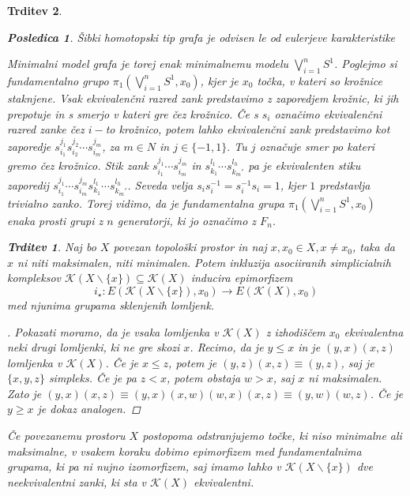 \documentclass[a4paper,12pt]{article}
\DeclareRobustCommand{\k}{
    \mathcal{K}
}
\theoremstyle{definition}
\theoremstyle{plain}
\theoremstyle{definition}
\theoremstyle{plain}
\newtheorem{trditev}{Trditev}
\theoremstyle{plain}
\newtheorem{posledica}{Posledica}
\theoremstyle{plain}
\theoremstyle{plain}
\newenvironment{dokaz}{\begin{proof}[\bfseries\upshape\proofname]}{\end{proof}}
\begin{document}
\begin{trditev}
\begin{posledica}
    \label{pos:karakteristika}
    Šibki homotopski tip grafa je odvisen le od eulerjeve karakteristike
\end{posledica}

Minimalni model grafa je torej enak minimalnemu modelu  $\bigvee\limits_{i=1}^{n}S^1$. Poglejmo si 
fundamentalno grupo  $\pi_1(\bigvee\limits_{i=1}^{n}S^1,x_0)$, kjer je $x_0$ točka, v kateri so krožnice 
staknjene. Vsak ekvivalenčni razred zank predstavimo z zaporedjem krožnic, ki jih prepotuje in s 
smerjo v kateri gre čez krožnico. Če s $s_i$ označimo ekvivalenčni razred zanke čez $i-$to krožnico, potem lahko ekvivalenčni 
zank  predstavimo kot zaporedje $s_{i_1}^{j_1}s_{i_2}^{j_2}\cdots s_{i_m}^{j_m}$, za $m\in N$ in 
$j\in \{-1,1\}.$ Tu $j$ označuje smer po kateri gremo čez krožnico. Stik zank 
$s_{i_1}^{j_1}\cdots s_{i_m}^{j_m}$ in $s_{k_1}^{l_1}\cdots s_{k_m'}^{l_h}$ pa je ekvivalenten 
stiku zaporedij $s_{i_1}^{j_1}\cdots s_{i_m}^{j_m}s_{k_1}^{l_1}\cdots s_{k_m'}^{l_h}$.
Seveda velja $s_i s_i^{-1}=s_i^{-1}s_i=1$, kjer $1$ predstavlja trivialno zanko. 
Torej vidimo, da je fundamentalna grupa $\pi_1(\bigvee\limits_{i=1}^{n}S^1,x_0)$ enaka prosti grupi z $n$
generatorji, ki jo označimo z $F_n$.

\begin{trditev}
    Naj bo $X$ povezan topološki prostor in naj $x,x_0\in X, x\neq x_0$, taka da $x$ ni niti maksimalen, niti minimalen. Potem inkluzija asociiranih simplicialnih kompleksov $\k(X\backslash\{x\})\subseteq \k(X)$ inducira epimorfizem 
    $$
i_\star:E(\k(X\backslash\{x\}),x_0)\rightarrow E(\k(X),x_0)
    $$
    med njunima grupama sklenjenih lomljenk.
\end{trditev}

\begin{dokaz}
    Pokazati moramo, da je vsaka lomljenka v $\k(X)$ z izhodiščem $x_0$ ekvivalentna neki drugi lomljenki, ki ne gre skozi $x$.
    Recimo, da je $y\leq x$ in je $(y,x)(x,z)$ lomljenka v $\k(X)$. Če je $x\leq z$, potem je $(y,z)(x,z)\equiv(y,z)$, saj je $\{x,y,z\}$ simpleks. Če je pa $z< x$, potem obstaja $w>x$, saj $x$ ni maksimalen. Zato je $(y,x)(x,z)\equiv(y,x)(x,w)(w,x)(x,z)\equiv (y,w)(w,z)$. Če je $y\geq x$ je dokaz analogen.
\end{dokaz}

Če povezanemu prostoru $X$ postopoma odstranjujemo točke, ki niso minimalne ali maksimalne, v vsakem koraku dobimo epimorfizem med fundamentalnima grupama, ki pa ni nujno izomorfizem, saj imamo lahko v $\k(X\backslash\{x\})$ dve neekvivalentni zanki, ki sta v $\k(X)$ ekvivalentni.




\end{trditev}
\end{document}
